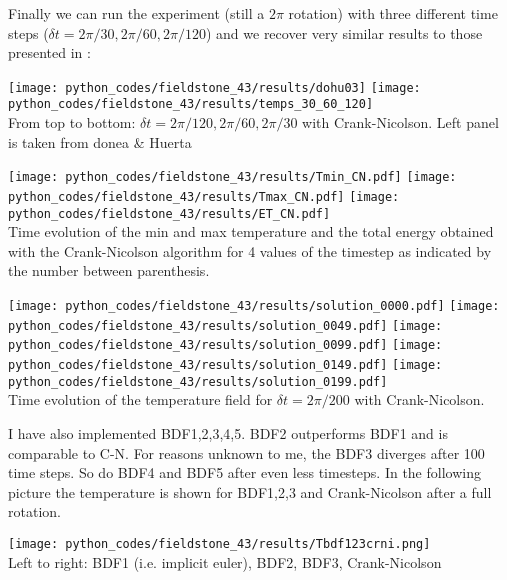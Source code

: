 Finally we can run the experiment (still a $2\pi$ rotation) 
with three different time steps ($\delta t=2\pi/30,2\pi/60,2\pi/120$) 
and we recover very similar results to those presented in \cite{dohu03}:

\begin{center}
\texttt{[image: python\_codes/fieldstone\_43/results/dohu03]}
\texttt{[image: python\_codes/fieldstone\_43/results/temps\_30\_60\_120]}\\
{\small From top to bottom: $\delta t=2\pi/120,2\pi/60,2\pi/30$ with Crank-Nicolson. Left panel is taken from donea \& Huerta \cite{dohu03}}
\end{center}

\begin{center}
\texttt{[image: python\_codes/fieldstone\_43/results/Tmin\_CN.pdf]}
\texttt{[image: python\_codes/fieldstone\_43/results/Tmax\_CN.pdf]}
\texttt{[image: python\_codes/fieldstone\_43/results/ET\_CN.pdf]}\\
{\small Time evolution of the min and max temperature and the total energy obtained with the Crank-Nicolson algorithm for 4 values of the timestep as indicated by the number between parenthesis.}
\end{center}


\begin{center}
\texttt{[image: python\_codes/fieldstone\_43/results/solution\_0000.pdf]}
\texttt{[image: python\_codes/fieldstone\_43/results/solution\_0049.pdf]}
\texttt{[image: python\_codes/fieldstone\_43/results/solution\_0099.pdf]}
\texttt{[image: python\_codes/fieldstone\_43/results/solution\_0149.pdf]}
\texttt{[image: python\_codes/fieldstone\_43/results/solution\_0199.pdf]}\\
{\small Time evolution of the temperature field for $\delta t=2\pi/200$ with Crank-Nicolson.}
\end{center}

I have also implemented BDF1,2,3,4,5. BDF2 outperforms BDF1 and is comparable to C-N. 
For reasons unknown to me, the BDF3 diverges after 100 time steps. So do 
BDF4 and BDF5 after even less timesteps. In the following picture the temperature is shown for 
BDF1,2,3 and Crank-Nicolson after a full rotation.

\begin{center}
\texttt{[image: python\_codes/fieldstone\_43/results/Tbdf123crni.png]}\\
{\captionfont Left to right: BDF1 (i.e. implicit euler), BDF2, BDF3, Crank-Nicolson}
\end{center}

